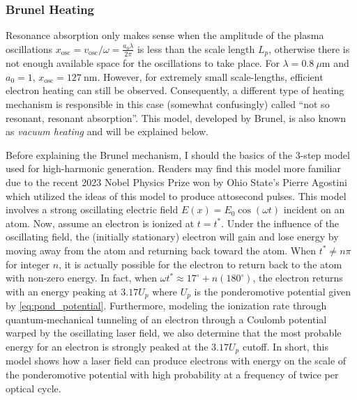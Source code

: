 \subsubsection{Brunel Heating}
Resonance absorption only makes sense when the amplitude of the plasma oscillations $x_\text{osc} = v_\text{osc} / \omega = \frac{a_0 \lambda}{2 \pi}$ is less than the scale length $L_p$\cite{Gibbon_2005_Plasma}, otherwise there is not enough available space for the oscillations to take place. For $\lambda = \SI{0.8}{\mu \meter}$ and $a_0 = 1$, $x_\text{osc} = \SI{127}{\nano \meter}$. However, for extremely small scale-lengths, efficient electron heating can still be observed\cite{Grimes_1999_PRL}. Consequently, a different type of heating mechanism is responsible in this case (somewhat confusingly) called ``not so resonant, resonant absorption''\cite{Brunel_1987_PRL}. This model, developed by Brunel, is also known as \emph{vacuum heating} and will be explained below. 

Before explaining the Brunel mechanism, I should the basics of the 3-step model used for high-harmonic generation\cite{Corkum_1993_PRL}. Readers may find this model more familiar due to the recent 2023 Nobel Physics Prize won by Ohio State's Pierre Agostini\cite{Nobel_2023} which utilized the ideas of this model to produce attosecond pulses. This model involves a strong oscillating electric field $E(x) = E_0 \cos(\omega t)$ incident on an atom. Now, assume an electron is ionized at $t = t^*$. Under the influence of the oscillating field, the (initially stationary) electron will gain  and lose energy by moving away from the atom and returning back toward the atom. When $t^* \neq n \pi$ for integer $n$, it is actually possible for the electron to return back to the atom with non-zero energy. In fact, when $\omega t^* \approx 17^\circ + n (180^\circ)$, the electron returns with an energy peaking at $3.17 U_p$ where $U_p$ is the ponderomotive potential given by \cref{eq:pond_potential}. Furthermore, modeling the ionization rate through quantum-mechanical tunneling of an electron through a Coulomb potential warped by the oscillating laser field, we also determine that the most probable energy for an electron is strongly peaked at the $3.17 U_p$ cutoff. In short, this model shows how a laser field can produce electrons with energy on the scale of the ponderomotive potential with high probability at a frequency of twice per optical cycle. 

